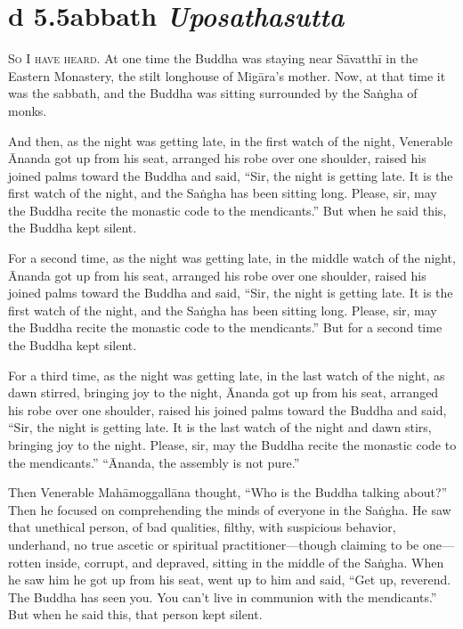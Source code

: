 \documentclass[12pt,openany]{book}%
\newcommand*{\suttatitleacronym}[1]{\smaller[2]{#1}\vspace*{.3em}}
\newcommand*{\suttatitletranslation}[1]{\linebreak{#1}}
\newcommand*{\suttatitleroot}[1]{\linebreak\smaller[2]\itshape{#1}}
\newcommand*{\tocacronym}[1]{\hspace*{-3.3em}{#1}\quad}
\newcommand*{\toctranslation}[1]{#1}
\newcommand*{\tocroot}[1]{(\textit{#1})}
\newcommand*{\scevam}[1]{\textsc{#1}}
\begin{document}
%
\section*{{\suttatitleacronym Ud 5.5}{\suttatitletranslation Sabbath }{\suttatitleroot Uposathasutta}}
\addcontentsline{toc}{section}{\tocacronym{Ud 5.5} \toctranslation{Sabbath } \tocroot{Uposathasutta}}

\scevam{So I have heard. }At one time the Buddha was staying near \textsanskrit{Sāvatthī} in the Eastern Monastery, the stilt longhouse of \textsanskrit{Migāra}’s mother. Now, at that time it was the sabbath, and the Buddha was sitting surrounded by the \textsanskrit{Saṅgha} of monks. 

And then, as the night was getting late, in the first watch of the night, Venerable Ānanda got up from his seat, arranged his robe over one shoulder, raised his joined palms toward the Buddha and said, “Sir, the night is getting late. It is the first watch of the night, and the \textsanskrit{Saṅgha} has been sitting long. Please, sir, may the Buddha recite the monastic code to the mendicants.” But when he said this, the Buddha kept silent. 

For a second time, as the night was getting late, in the middle watch of the night, Ānanda got up from his seat, arranged his robe over one shoulder, raised his joined palms toward the Buddha and said, “Sir, the night is getting late. It is the first watch of the night, and the \textsanskrit{Saṅgha} has been sitting long. Please, sir, may the Buddha recite the monastic code to the mendicants.” But for a second time the Buddha kept silent. 

For a third time, as the night was getting late, in the last watch of the night, as dawn stirred, bringing joy to the night, Ānanda got up from his seat, arranged his robe over one shoulder, raised his joined palms toward the Buddha and said, “Sir, the night is getting late. It is the last watch of the night and dawn stirs, bringing joy to the night. Please, sir, may the Buddha recite the monastic code to the mendicants.” “Ānanda, the assembly is not pure.” 

Then Venerable \textsanskrit{Mahāmoggallāna} thought, “Who is the Buddha talking about?” Then he focused on comprehending the minds of everyone in the \textsanskrit{Saṅgha}. He saw that unethical person, of bad qualities, filthy, with suspicious behavior, underhand, no true ascetic or spiritual practitioner—though claiming to be one—rotten inside, corrupt, and depraved, sitting in the middle of the \textsanskrit{Saṅgha}. When he saw him he got up from his seat, went up to him and said, “Get up, reverend. The Buddha has seen you. You can’t live in communion with the mendicants.” But when he said this, that person kept silent. 
\end{document}
